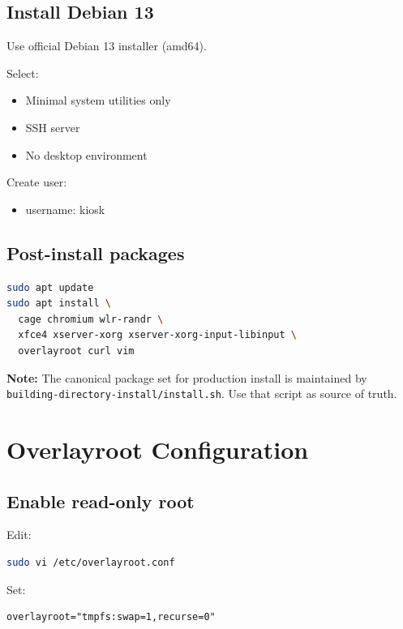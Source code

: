 \documentclass[11pt,letterpaper]{article}
\begin{document}
\subsection{Install Debian 13}

Use official Debian 13 installer (amd64).

Select:

\begin{itemize}
\item Minimal system utilities only
\item SSH server
\item No desktop environment
\end{itemize}

Create user:

\begin{itemize}
\item username: kiosk
\end{itemize}

\subsection{Post-install packages}

\begin{lstlisting}[language=bash]
sudo apt update
sudo apt install \
  cage chromium wlr-randr \
  xfce4 xserver-xorg xserver-xorg-input-libinput \
  overlayroot curl vim
\end{lstlisting}

\textbf{Note:} The canonical package set for production install is maintained by \texttt{building-directory-install/install.sh}. Use that script as source of truth.

\section{Overlayroot Configuration}

\subsection{Enable read-only root}

Edit:

\begin{lstlisting}[language=bash]
sudo vi /etc/overlayroot.conf
\end{lstlisting}

Set:

\begin{lstlisting}
overlayroot="tmpfs:swap=1,recurse=0"
\end{lstlisting}
\end{document}
